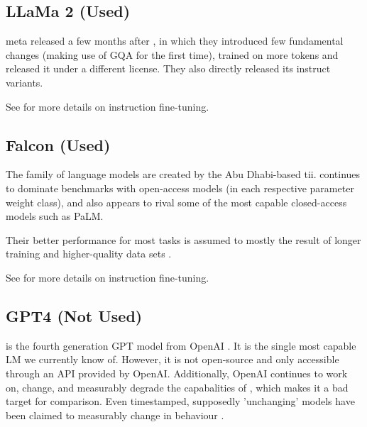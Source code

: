 \subsection{LLaMa 2 (Used)}\label{sub:llama2}
\gls{meta} released  a few months after , in which they introduced few fundamental changes (making use of \gls{GQA} for the first time), trained on more tokens and released it under a different license.
They also directly released its instruct variants.

See  for more details on instruction fine-tuning.

\subsection{Falcon (Used)}\label{sub:falcon}
The  \cite{zxhang_falcon_2023} family of language models are created by the Abu Dhabi-based \gls{tii}.
 continues to dominate benchmarks with open-access models (in each respective parameter weight class), and also appears to rival some of the most capable closed-access models such as \gls{PaLM}.

Their better performance for most tasks is assumed to mostly the result of longer training and higher-quality data sets \cite{zxhang_falcon_2023}.

See  for more details on instruction fine-tuning.

\subsection{GPT4 (Not Used)}\label{sub:GPT4}
 is the fourth generation \gls{GPT} model from \gls{OpenAI} \cite{openai_gpt4_2023}.
It is the single most capable \acrlong{LM} we currently know of.
However, it is not open-source and only accessible through an API provided by \gls{OpenAI}.
Additionally, \gls{OpenAI} continues to work on, change, and measurably degrade the capabalities \cite{chen_how_2023} of , which makes it a bad target for comparison.
Even timestamped, supposedly 'unchanging' models have been claimed to measurably change in behaviour \cite{jw1224_hn}.

